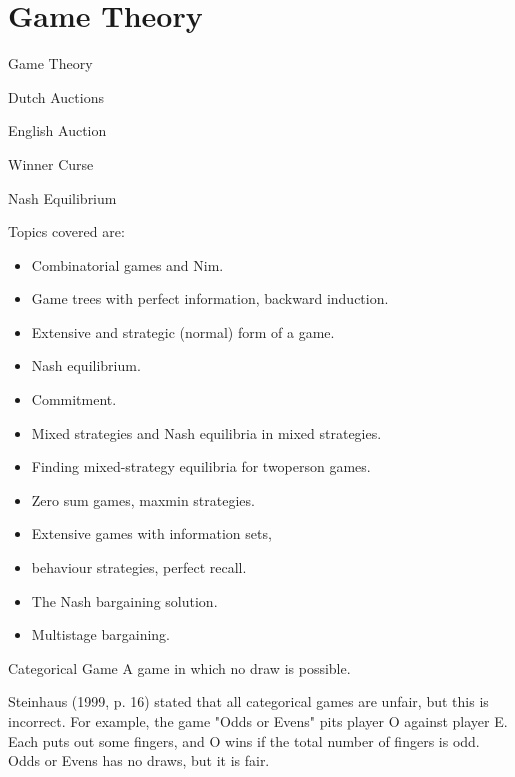 \documentclass[]{report}
\begin{document}
\chapter{Game Theory}	
	Game Theory

Dutch Auctions

English Auction

Winner Curse

Nash Equilibrium

Topics covered are:
\begin{multicols}{2}
\begin{itemize}
\item Combinatorial games and Nim.

\item Game trees with perfect information, backward induction.

\item Extensive and strategic (normal) form of a game.

\item Nash equilibrium.

\item Commitment.

\item Mixed strategies and Nash equilibria in mixed strategies.

\item Finding mixed-strategy equilibria for twoperson games.

\item Zero sum games, maxmin strategies.

\item Extensive games with information sets,

\item behaviour strategies, perfect recall.

\item The Nash bargaining solution.

\item Multistage bargaining.
\end{itemize}

\end{multicols}


Categorical Game
A game in which no draw is possible.

Steinhaus (1999, p. 16) stated that all categorical games are unfair, but this is incorrect. For example, the game "Odds or Evens" pits player O against player E. Each puts out some fingers, and O wins if the total number of fingers is odd. Odds or Evens has no draws, but it is fair.
\end{document}
